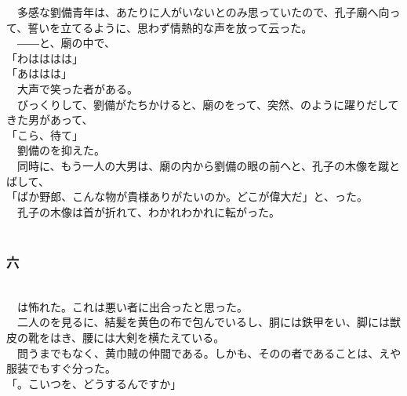 \documentclass[
  paper=a5,
  fontsize=10pt,
  jafontsize=9.5pt,
  tate,                  %
  open_bracket_pos=nibu, %
]{jlreq}
\begin{document}
　多感な劉備青年は、あたりに人がいないとのみ思っていたので、孔子廟へ向って、誓いを立てるように、思わず情熱的な声を放って云った。\\


　――と、廟の中で、\\


「わはははは」\\


「あははは」\\


　大声で笑った者がある。\\


　びっくりして、劉備がたちかけると、廟のをって、突然、のように躍りだしてきた男があって、\\


「こら、待て」\\


　劉備のを抑えた。\\


　同時に、もう一人の大男は、廟の内から劉備の眼の前へと、孔子の木像を蹴とばして、\\


「ばか野郎、こんな物が貴様ありがたいのか。どこが偉大だ」と、った。\\


　孔子の木像は首が折れて、わかれわかれに転がった。\\

\\

\subsubsection{六}

\\


　は怖れた。これは悪い者に出合ったと思った。\\


　二人のを見るに、結髪を黄色の布で包んでいるし、胴には鉄甲をい、脚には獣皮の靴をはき、腰には大剣を横たえている。\\


　問うまでもなく、黄巾賊の仲間である。しかも、そのの者であることは、えや服装でもすぐ分った。\\


「。こいつを、どうするんですか」\\
\end{document}
